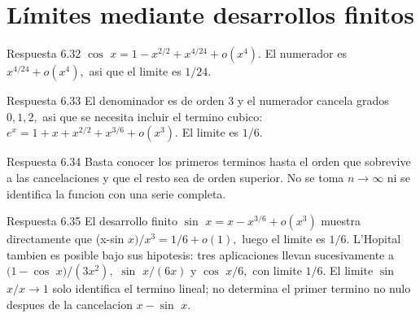 \documentclass[10pt,a4paper,oneside,openany]{book}
\begin{document}
\section{Límites mediante desarrollos finitos}
\begin{PSevenAnswerFixed}{Respuesta 6.32}
\(\cos\) \(x=1-x^{2/2}+x^{4/24}+o(x^{4})\). El numerador es \(x^{4/24}+o(x^{4}),\) asi que el limite es \(1/24\).
\end{PSevenAnswerFixed}
\begin{PSevenAnswerFixed}{Respuesta 6.33}
El denominador es de orden \(3\) y el numerador cancela grados \(0,1,2,\) asi que se necesita incluir el termino cubico: \(e^x=1+x+x^{2/2}+x^{3/6}+o(x^{3})\). El limite es \(1/6\).
\end{PSevenAnswerFixed}
\begin{PSevenAnswerFixed}{Respuesta 6.34}
Basta conocer los primeros terminos hasta el orden que sobrevive a las cancelaciones y que el resto sea de orden superior. No se toma \(n\to \infty \) ni se identifica la funcion con una serie completa.
\end{PSevenAnswerFixed}
\begin{PSevenAnswerFixed}{Respuesta 6.35}
El desarrollo finito \(\sin\) \(x=x-x^{3/6}+o(x^{3})\) muestra directamente que (x-sin \(x)/x^{3}=1/6+o(1),\) luego el limite es \(1/6\). L'Hopital tambien es posible bajo sus hipotesis: tres aplicaciones llevan sucesivamente a \((1-\cos\) \(x)/(3x^{2}),\) \(\sin\) \(x/(6x)\) y \(\cos\) \(x/6,\) con limite \(1/6\). El limite \(\sin\) \(x/x\to 1\) solo identifica el termino lineal; no determina el primer termino no nulo despues de la cancelacion \(x-\sin\) \(x\).
\end{PSevenAnswerFixed}
\end{document}
